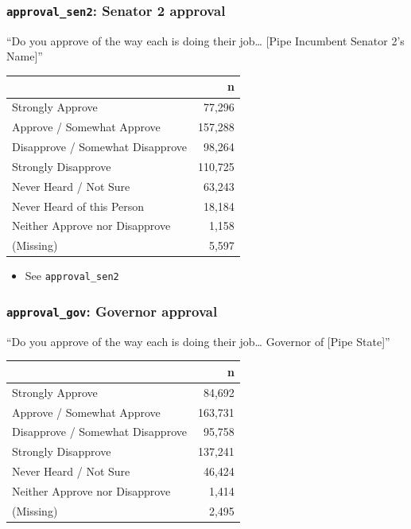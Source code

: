 \documentclass[10pt,article,oneside]{memoir}
\theoremstyle{definition}
\begin{document}
\hypertarget{approval_sen2-senator-2-approval}{%
\subsubsection{\texorpdfstring{\texttt{approval\_sen2}: Senator 2
approval}{approval\_sen2: Senator 2 approval}}\label{approval_sen2-senator-2-approval}}

``Do you approve of the way each is doing their job\ldots{} {[}Pipe
Incumbent Senator 2's Name{]}''

\begin{table}[H]
\centering
\begin{tabular}{lr}
\toprule
 & n\\
\midrule
Strongly Approve & 77,296\\
Approve / Somewhat Approve & 157,288\\
Disapprove / Somewhat Disapprove & 98,264\\
Strongly Disapprove & 110,725\\
Never Heard / Not Sure & 63,243\\
Never Heard of this Person & 18,184\\
Neither Approve nor Disapprove & 1,158\\
(Missing) & 5,597\\
\bottomrule
\end{tabular}
\end{table}

\begin{itemize}
\tightlist
\item
  See \texttt{approval\_sen2}
\end{itemize}

\hypertarget{approval_gov-governor-approval}{%
\subsubsection{\texorpdfstring{\texttt{approval\_gov}: Governor
approval}{approval\_gov: Governor approval}}\label{approval_gov-governor-approval}}

``Do you approve of the way each is doing their job\ldots{} Governor of
{[}Pipe State{]}''

\begin{table}[H]
\centering
\begin{tabular}{lr}
\toprule
 & n\\
\midrule
Strongly Approve & 84,692\\
Approve / Somewhat Approve & 163,731\\
Disapprove / Somewhat Disapprove & 95,758\\
Strongly Disapprove & 137,241\\
Never Heard / Not Sure & 46,424\\
Neither Approve nor Disapprove & 1,414\\
(Missing) & 2,495\\
\bottomrule
\end{tabular}
\end{table}
\end{document}
